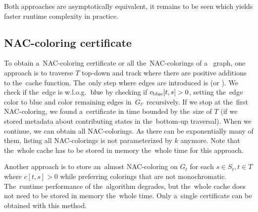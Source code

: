 Both approaches are asymptotically equivalent,
it remains to be seen which yields faster runtime complexity in practice.



\subsection{NAC-coloring certificate}

To obtain a~NAC-coloring certificate or all the~NAC-colorings of a~ graph,
one approach is to traverse \( T \) top-down
and track where there are positive additions to the~cache function.
%
The~only step where edges are introduced is \IntroduceEdgeNode{}
(or \IntroduceVertexWithEdgesNode{}).
We check if the~edge is w.l.o.g.\ \( \text{blue} \) by checking if \( c_{\text{blue}}[t,s] > 0 \),
setting the~edge color to blue and color remaining edges in~\( G_{t'} \) recursively.
If we stop at the~first NAC-coloring, we found a~certificate in time bounded by
the~size of \( T \)
(if we stored metadata about contributing states in the~bottom-up traversal).
%
When we continue, we can obtain all NAC-colorings.
As there can be exponentially many of them,
listing all NAC-colorings is not parameterized by \( k \) anymore.
Note that the~whole cache has to be stored in memory
the~whole time for this approach.

Another approach is to store an~almost NAC-coloring on \( G_t \)
for each \( s \in S_t, t \in T \) where \( c[t, s] > 0 \)
while preferring colorings that are not monochromatic.
The~runtime performance of the~algorithm degrades,
but the~whole cache does not need to be stored in memory the~whole time.
Only a~single certificate can be obtained with this method.


%


